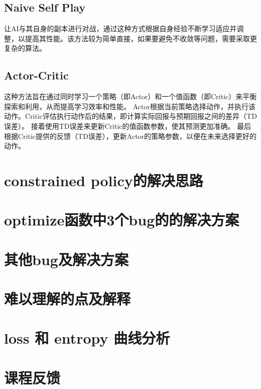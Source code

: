 \documentclass{ctexart}
\begin{document}
\subsection{Naive Self Play}
让AI与其自身的副本进行对战，通过这种方式根据自身经验不断学习适应并调整，以提高其性能。该方法较为简单直接，如果要避免不收敛等问题，需要采取更复杂的算法。
\subsection{Actor-Critic}
这种方法旨在通过同时学习一个策略（即Actor）和一个值函数（即Critic）来平衡探索和利用，从而提高学习效率和性能。
Actor根据当前策略选择动作，并执行该动作。Critic评估执行动作后的结果，即计算实际回报与预期回报之间的差异（TD误差）。
接着使用TD误差来更新Critic的值函数参数，使其预测更加准确。
最后根据Critic提供的反馈（TD误差），更新Actor的策略参数，以便在未来选择更好的动作。
	\section{constrained policy的解决思路}
	\section{optimize函数中3个bug的的解决方案}
	\section{其他bug及解决方案}
	\section{难以理解的点及解释}
	\section{loss 和 entropy 曲线分析}
	\section{}
	\section{}
	\section{课程反馈}



	
\end{document}
